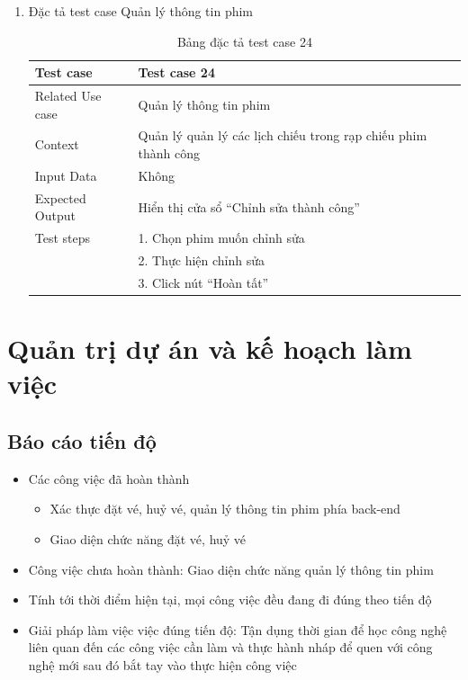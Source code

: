 \documentclass[a4paper, 12pt]{article}
\begin{document}
\begin{enumerate}
	\item Đặc tả test case Quản lý thông tin phim
	\begin{table}[H]
		\centering
		\begin{tabular}{|l|l|} 
		\hline
		\multicolumn{1}{|l|}{Test case} & \multicolumn{1}{l|}{Test case 24}                               \\ 
		\hline
		Related Use case                & Quản lý thông tin phim                                          \\ 
		\hline
		Context                         & Quản lý quản lý các lịch chiếu trong rạp chiếu phim thành công  \\ 
		\hline
		Input Data                      & Không                                                           \\ 
		\hline
		Expected Output                 & Hiển thị cửa sổ “Chỉnh sửa thành công”                          \\ 
		\hline
		Test steps                      & 1. Chọn phim muốn chỉnh sửa                                      \\
										& 2. Thực hiện chỉnh sửa                                           \\
										& 3. Click nút “Hoàn tất”                                          \\
		\hline
		\end{tabular}
		\caption{Bảng đặc tả test case 24}
	\end{table}
\end{enumerate}

\clearpage

\section{Quản trị dự án và kế hoạch làm việc}

\subsection{Báo cáo tiến độ}

\begin{itemize}
	\item Các công việc đã hoàn thành
	\begin{itemize}
		\item Xác thực đặt vé, huỷ vé, quản lý thông tin phim phía back-end
		\item Giao diện chức năng đặt vé, huỷ vé
	\end{itemize}
	\item Công việc chưa hoàn thành: Giao diện chức năng quản lý thông tin phim 

	\item Tính tới thời điểm hiện tại, mọi công việc đều đang đi đúng theo tiến độ
	\item Giải pháp làm việc việc đúng tiến độ: Tận dụng thời gian để học công nghệ liên quan đến các công việc cần làm và thực hành nháp để quen với công nghệ mới sau đó bắt tay vào thực hiện công việc
\end{itemize}
\end{document}
